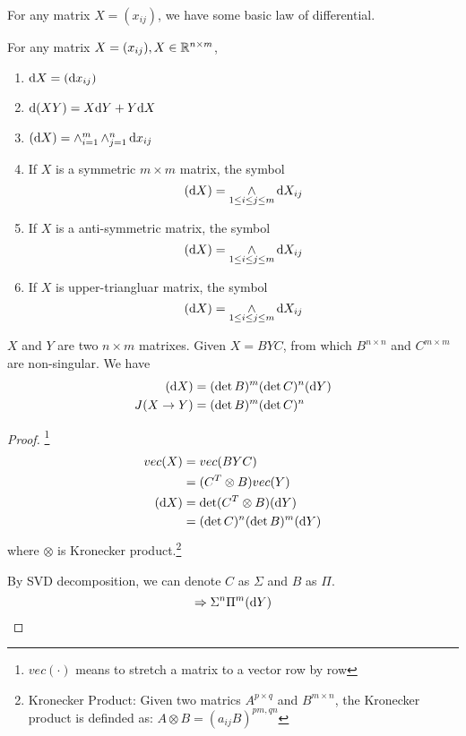 	For any matrix $X = (x_{ij})$, we have some basic law of differential.
	\begin{theorem}
		For any matrix $X = (x_{ij}), X\in\mathbb{R}^{n\times m}$, 
		\begin{enumerate}
			\item $\mathrm{d} X = (\mathrm{d} x_{ij})$
			\item $\mathrm{d}(XY) = X\mathrm{d} Y+ Y\mathrm{d} X$
			\item $(\mathrm{d} X) = \mathop{\wedge}_{i=1}^{m}\mathop{\wedge}_{j=1}^{n}\mathrm{d} x_{ij}$
			\item If $X$ is a symmetric $m\times m$ matrix, the symbol 
			$$(\mathrm{d} X) = \mathop{\wedge}_{1\leq i\leq j\leq m}\mathrm{d} X_{ij}$$
			\item If $X$ is a anti-symmetric matrix, the symbol
			$$(\mathrm{d} X) = \mathop{\wedge}_{1\leq i\leq j\leq m}\mathrm{d} X_{ij}$$
			\item If $X$ is upper-triangluar matrix, the symbol
			$$(\mathrm{d} X) = \mathop{\wedge}_{1\leq i\leq j\leq m}\mathrm{d} X_{ij}$$
		\end{enumerate}
	\end{theorem} 
	
	
	\begin{theorem}
		$X$ and $Y$ are two $n\times m$ matrixes. Given $X = BYC$, from which $B^{n\times n}$ and $C^{m\times m}$ are non-singular. We have
		\begin{align*}
			(\mathrm{d} X) & = (\det B)^m(\det C)^n (\mathrm{d} Y)\\
			J(X\to Y) & = (\det B)^m(\det C)^n
		\end{align*}
	\end{theorem}
	\begin{proof}
		\footnote{$vec(\cdot)$ means to stretch a matrix to a vector row by row}
		\begin{align*}
			vec(X) &= vec(BYC)\\
			& = (C^T\otimes B ) vec(Y)	\text{}	\\
			(\mathrm{d} X) & = \det(C^T\otimes B)(\mathrm{d} Y) \\
			& = (\det C)^n(\det B)^m (\mathrm{d} Y)	
		\end{align*}
	where $\otimes $ is Kronecker product.\footnote{Kronecker Product: Given two matrics $A^{p\times q}$ and $B^{m \times n }$, the Kronecker product is definded as: $A\otimes B = (a_{ij}B)^{pm, qn}$}
	
	 By SVD decomposition, we can denote $C$ as $\Sigma$ and $B$ as $\Pi$.
	 $$\Rightarrow \Sigma^n\Pi^m(\mathrm{d} Y)$$
	\end{proof}
	
